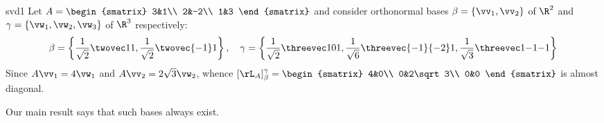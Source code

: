 \begin{example}{}{svd1}
Let $A=\begin{smatrix}
3&1\\
2&-2\\
1&3
\end{smatrix}$ and consider orthonormal bases $\beta=\{\vv_1,\vv_2\}$ of $\R^2$ and $\gamma=\{\vw_1,\vw_2,\vw_3\}$ of $\R^3$ respectively:
\[\beta=\left\{\frac 1{\sqrt 2}\twovec 11,\frac 1{\sqrt 2}\twovec{-1}1\right\},\quad \smash{\gamma=\left\{\frac 1{\sqrt 2}\threevec 101,\frac 1{\sqrt 6}\threevec{-1}{-2}1, \frac 1{\sqrt 3}\threevec 1{-1}{-1}\right\}}\]
Since $A\vv_1=4\vw_1$ and $A\vv_2=2\sqrt 3\vw_2$, whence $[\rL_A]_\beta^\gamma=\begin{smatrix}
4&0\\
0&2\sqrt 3\\
0&0
\end{smatrix}$ is almost diagonal.
\end{example}

Our main result says that such bases always exist.

